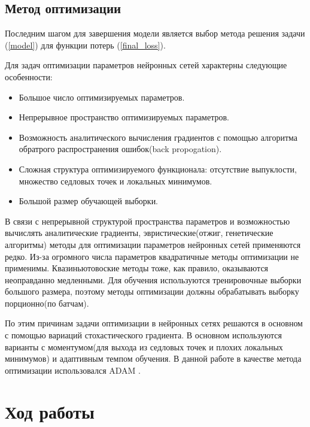 \documentclass[12pt, a4paper]{extarticle}
\begin{document}
\subsection{Метод оптимизации}

Последним шагом для завершения модели является выбор метода решения 
задачи (\ref{model}) для функции потерь (\ref{final_loss}).

Для задач оптимизации параметров нейронных сетей характерны следующие особенности:
\begin{itemize}
	\item Большое число оптимизируемых параметров.
	
	\item Непрерывное пространство оптимизируемых параметров.
	
	\item Возможность аналитического вычисления градиентов с помощью
алгоритма обратрого распространения ошибок(back propogation).
		
	\item Сложная структура оптимизируемого функционала: отсутствие 	выпуклости, множество седловых точек и локальных минимумов.
	
	\item Большой размер обучающей выборки.
	
\end{itemize} 
	
В связи с непрерывной структурой пространства параметров и возможностью вычислять аналитические градиенты, эвристические(отжиг, генетические алгоритмы) методы для оптимизации параметров нейронных сетей применяются редко. Из-за огромного числа параметров квадратичные методы оптимизации не применимы. Квазиньютовоские методы тоже, как правило, оказываются неоправданно медленными. Для обучения используются тренировочные выборки большого размера, поэтому методы оптимизации должны обрабатывать выборку порционно(по батчам). 

По этим причинам задачи оптимизации в нейронных сетях решаются в основном с помощью вариаций стохастического градиента. В основном используются варианты с моментумом(для выхода из седловых точек и плохих локальных минимумов) и адаптивным темпом обучения. В данной работе в качестве метода оптимизации использовался ADAM \cite{19}.

\newpage


\section{Ход работы} \label{seg_tasks}
\end{document}
